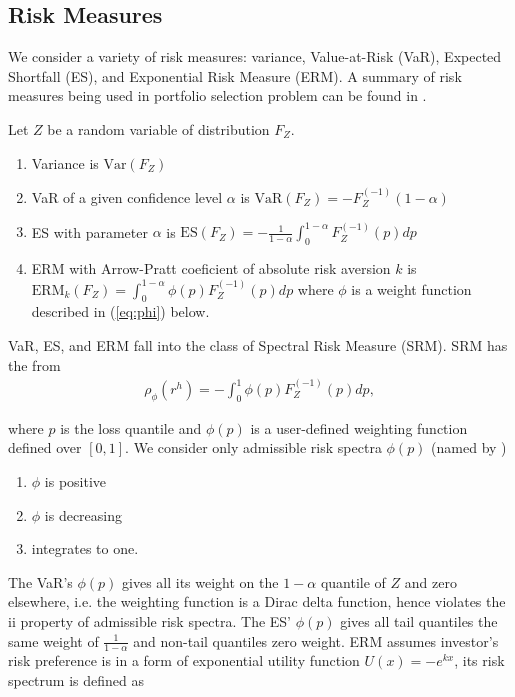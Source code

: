 \subsection{Risk Measures}\label{subsec:spectral-risk-measures}
We consider a variety of risk measures: variance, Value-at-Risk (VaR), Expected Shortfall (ES), and Exponential Risk Measure (ERM).
A summary of risk measures being used in portfolio selection problem can be found in \citet{hardle2008applied}.\medskip
\medskip


Let $Z$ be a random variable of distribution $F_Z$.
\begin{enumerate}
	\item Variance is $\text{Var}(F_Z)$
	\item VaR of a given confidence level $\alpha$ is $\text{VaR}(F_Z) = -F_{Z}^{(-1)}(1-\alpha)$
	\item ES with parameter $\alpha$ is $\text{ES}(F_Z) = -\frac{1}{1-\alpha}\int_0^{1-\alpha}F_Z^{(-1)}(p)dp$
	\item ERM with Arrow-Pratt coeficient of absolute risk aversion $k$ is $\text{ERM}_k(F_Z) = \int_0^{1-\alpha}\phi(p) F_Z^{(-1)}(p)dp$ where $\phi$ is a weight function described in (\ref{eq:phi}) below.
	\end{enumerate}\medskip

VaR, ES, and ERM fall into the class of Spectral Risk Measure (SRM).
SRM has the from \citep{Acerbi2002}%
\begin{align}
	\rho_\phi(r^h) = - \int_0^1 \phi(p) F_{Z}^{(-1)}(p)d p,
	\end{align}

where $p$ is the loss quantile and $\phi(p)$ is a user-defined weighting function defined over $[0,1]$. \medskip
We consider only admissible risk spectra $\phi(p)$ (named by \citet{Acerbi2002})
\begin{enumerate}[label=\roman*]
	\item $\phi$ is positive
	\item $\phi$ is decreasing
	\item integrates to one.
	\end{enumerate}\medskip

The VaR's $\phi(p)$ gives all its weight on the $1-\alpha$ quantile of $Z$ and zero elsewhere,
i.e. the weighting function is a Dirac delta function, hence violates the ii property of admissible risk spectra.
The ES' $\phi(p)$ gives all tail quantiles the same weight of $\frac{1}{1-\alpha}$ and non-tail quantiles zero weight.
ERM assumes investor's risk preference is in a form of exponential utility function $U(x)=-e^{kx}$,
its risk spectrum is defined as


